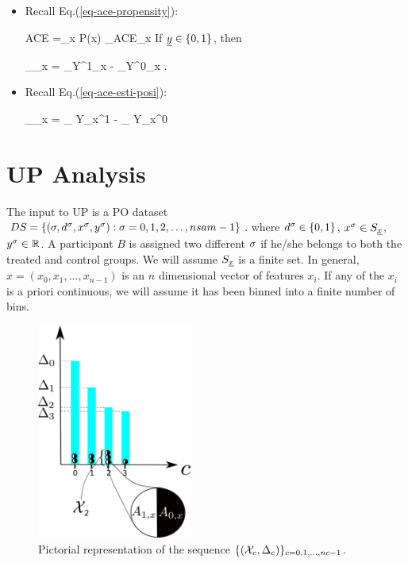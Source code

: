 \begin{itemize}

\item
Recall Eq.(\ref{eq-ace-propensity}):

\beq
ACE =\sum_x P(x)
_{ACE_x}
\eeq
If ${\underline{y}}\in \{0,1\}$, then

\beq
{}_{\displaystyle \delta_x}
=
_{\displaystyle Y^1_x}
-
_{\displaystyle Y^0_x}
\;.
\eeq

\item
Recall 
Eq.(\ref{eq-ace-esti-posi}):

\beq
{}_{\displaystyle\delta_x}
=
_
{\displaystyle Y_x^1}
-
_
{\displaystyle Y_x^0}
\label{eq-est-ace-uplift}
\eeq




\end{itemize}


\section{UP Analysis}
\label{sec-up-analysis}

The input
to UP is a PO
dataset $DS= \{ (\sigma, d^\sigma, x^\sigma, y^\sigma):
 \sigma=0, 1, 2, \ldots, nsam-1\}$.
where $d^\sigma\in \{0,1\}$, $x^\sigma \in S_{\underline{x}}$,
$y^\sigma\in { \mathbb{R}}$.
A  participant $B$
is assigned two different
$\sigma$
if he/she
belongs to
both the treated and control groups.
We will assume 
$S_{\underline{x}}$ is a finite set.
In general,
$x=(x_0, x_1,\dots, x_{n-1})$ is an $n$ dimensional 
vector of features $x_i$.
If any of the $x_i$
is a priori continuous, we will
assume it has  been binned into
a finite number of bins.

\begin{figure}[h!]
\centering
\includegraphics[width=2in]
{uplift/uplift-bins.png}
\caption{
Pictorial
representation
of the sequence
$\{({\cal X}_c, \Delta_c)\}_{c=0, 1, \ldots, nc-1}$.
}
\label{fig-uplift-bins}
\end{figure}


